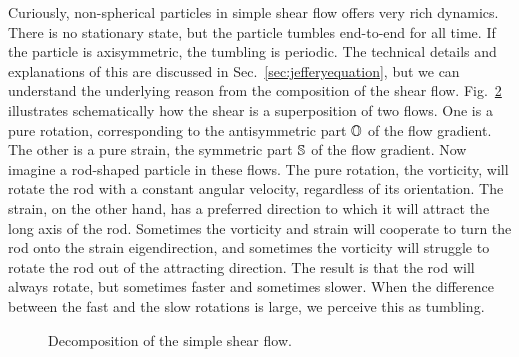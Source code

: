 \documentclass[thesis.tex]{subfiles}
\begin{document}
Curiously, non-spherical particles in simple shear flow offers very rich dynamics. There is no stationary state, but the particle tumbles end-to-end for all time. If the particle is axisymmetric, the tumbling is periodic. The technical details and explanations of this are discussed in Sec.~\ref{sec:jefferyequation}, but we can understand the underlying reason from the composition of the shear flow. Fig.~\ref{fig:shear_decomposition} illustrates schematically how the shear is a superposition of two flows. One is a pure rotation, corresponding to the antisymmetric part $\mathbb{O}$ of the flow gradient. The other is a pure strain, the symmetric part $\mathbb{S}$ of the flow gradient. Now imagine a rod-shaped particle in these flows. The pure rotation, the vorticity, will rotate the rod with a constant angular velocity, regardless of its orientation. The strain, on the other hand, has a preferred direction to which it will attract the long axis of the rod. Sometimes the vorticity and strain will cooperate to turn the rod onto the strain eigendirection, and sometimes the vorticity will struggle to rotate the rod out of the attracting direction. The result is that the rod will always rotate, but sometimes faster and sometimes slower. When the difference between the fast and the slow rotations is large, we perceive this as tumbling.
\begin{figure}
\begin{center}
\end{center}
\caption{\label{fig:coordinates} }%
\end{figure}
\begin{figure}
\begin{center}
\end{center}
\caption{\label{fig:shear_decomposition} Decomposition of the simple shear flow.}%
\end{figure}
\end{document}
